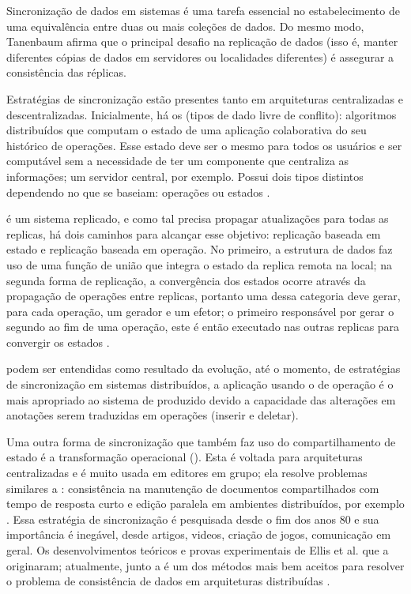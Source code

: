 Sincronização de dados em sistemas é uma tarefa essencial no estabelecimento de uma equivalência entre duas ou mais coleções de dados. Do mesmo modo, Tanenbaum \cite{tanenbaum2007dist} afirma que o principal desafio na replicação de dados (isso é, manter diferentes cópias de dados em servidores ou localidades diferentes) é assegurar a consistência das réplicas. 

Estratégias de sincronização estão presentes tanto em arquiteturas centralizadas e descentralizadas. Inicialmente, há os  (tipos de dado livre de conflito): algoritmos distribuídos que computam o estado de uma aplicação colaborativa do seu histórico de operações. Esse estado deve ser o mesmo para todos os usuários e ser computável sem a necessidade de ter um componente que centraliza as informações; um servidor central, por exemplo. Possui dois tipos distintos dependendo no que se baseiam: operações ou estados \cite{weidner2023crdtsurvey}.

 é um sistema replicado, e como tal precisa propagar atualizações para todas as replicas, há dois caminhos para alcançar esse objetivo: replicação baseada em estado e replicação baseada em operação. No primeiro, a estrutura de dados faz uso de uma função de união que integra o estado da replica remota na local; na segunda forma de replicação, a convergência dos estados ocorre através da propagação de operações entre replicas, portanto uma  dessa categoria deve gerar, para cada operação, um gerador e um efetor; o primeiro responsável por gerar o segundo ao fim de uma operação, este é então executado nas outras replicas para convergir os estados \cite{PreguicaBaqueroShapiro2018CRDT}.

 podem ser entendidas como resultado da evolução, até o momento, de estratégias de sincronização em sistemas distribuídos, a aplicação usando o  de operação é o mais apropriado ao sistema de  produzido devido a capacidade das alterações em anotações serem traduzidas em operações (inserir e deletar).

Uma outra forma de sincronização que também faz uso do compartilhamento de estado é a transformação operacional (). Esta é voltada para arquiteturas centralizadas e é muito usada em editores em grupo; ela resolve problemas similares a : consistência na manutenção de documentos compartilhados com tempo de resposta curto e edição paralela em ambientes distribuídos, por exemplo \cite{SunEllis1998OperationalTransformation}. Essa estratégia de sincronização é pesquisada desde o fim dos anos 80 e sua importância é inegável, desde artigos, videos, criação de jogos, comunicação  em geral. Os desenvolvimentos teóricos e provas experimentais de Ellis et al. que a originaram; atualmente, junto a  é um dos métodos mais bem aceitos para resolver o problema de consistência de dados em arquiteturas distribuídas \cite{GadeaIonescuIonescu2020ControlLoopOT}.

